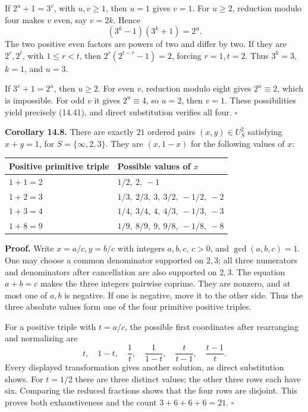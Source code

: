 \documentclass[
  11pt,
  a4paper,
]{article}
\newcounter{none} %
\begin{document}
If \(2^u+1=3^v\), with \(u,v\ge1\), then \(u=1\) gives \(v=1\). For
\(u\ge2\), reduction modulo four makes \(v\) even, say \(v=2k\). Hence
\[
(3^k-1)(3^k+1)=2^u.
\tag{14.42}
\] The two positive even factors are powers of two and differ by two. If
they are \(2^r,2^t\), with \(1\le r<t\), then \(2^r(2^{t-r}-1)=2\),
forcing \(r=1,t=2\). Thus \(3^k=3\), \(k=1\), and \(u=3\).

If \(3^v+1=2^u\), then \(u\ge2\). For even \(v\), reduction modulo eight
gives \(2^u\equiv2\), which is impossible. For odd \(v\) it gives
\(2^u\equiv4\), so \(u=2\), then \(v=1\). These possibilities yield
precisely (14.41), and direct substitution verifies all four.
\(\square\)

\textbf{Corollary 14.8.} There are exactly \(21\) ordered pairs
\((x,y)\in U_S^2\) satisfying \(x+y=1\), for \(S=\{\infty,2,3\}\). They
are \((x,1-x)\) for the following values of \(x\):

{\def\LTcaptype{none} %
\begin{longtable}[]{@{}ll@{}}
\toprule\noalign{}
Positive primitive triple & Possible values of \(x\) \\
\midrule\noalign{}
\endhead
\bottomrule\noalign{}
\endlastfoot
\(1+1=2\) & \(1/2,\ 2,\ -1\) \\
\(1+2=3\) & \(1/3,\ 2/3,\ 3,\ 3/2,\ -1/2,\ -2\) \\
\(1+3=4\) & \(1/4,\ 3/4,\ 4,\ 4/3,\ -1/3,\ -3\) \\
\(1+8=9\) & \(1/9,\ 8/9,\ 9,\ 9/8,\ -1/8,\ -8\) \\
\end{longtable}
}

\textbf{Proof.} Write \(x=a/c,y=b/c\) with integers \(a,b,c\), \(c>0\),
and \(\gcd(a,b,c)=1\). One may choose a common denominator supported on
\(2,3\); all three numerators and denominators after cancellation are
also supported on \(2,3\). The equation \(a+b=c\) makes the three
integers pairwise coprime. They are nonzero, and at most one of \(a,b\)
is negative. If one is negative, move it to the other side. Thus the
three absolute values form one of the four primitive positive triples.

For a positive triple with \(t=a/c\), the possible first coordinates
after rearranging and normalizing are \[
t,\quad1-t,\quad\frac1t,\quad\frac1{1-t},\quad
\frac{t}{t-1},\quad\frac{t-1}{t}.
\tag{14.43}
\] Every displayed transformation gives another solution, as direct
substitution shows. For \(t=1/2\) there are three distinct values; the
other three rows each have six. Comparing the reduced fractions shows
that the four rows are disjoint. This proves both exhaustiveness and the
count \(3+6+6+6=21\). \(\square\)
\end{document}
